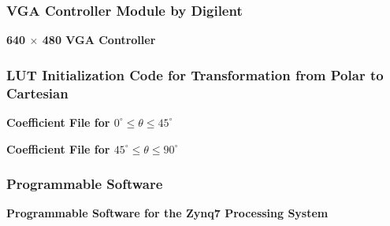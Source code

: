 \subsubsection{VGA Controller Module by Digilent} \label{vga_controller}
\textbf{640 $\times$ 480 VGA Controller}
\singlespacing

\doublespacing

\subsubsection{LUT Initialization Code for Transformation from Polar to Cartesian} \label{coe_file}
\textbf{Coefficient File for $0^\circ{}\leq{}\theta{}\leq45^\circ$}
\singlespacing

\doublespacing
\par
\textbf{Coefficient File for $45^\circ{}\leq{}\theta{}\leq90^\circ$}
\singlespacing

\doublespacing

\subsubsection{Programmable Software} \label{ps_code}
\textbf{Programmable Software for the Zynq7 Processing System}
\singlespacing

\doublespacing






